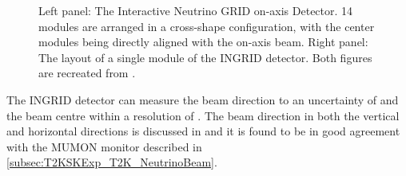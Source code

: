 \begin{figure}[h]
\begin{subfigure}[t]{0.55\textwidth}
  \end{subfigure}%
  \caption{Left panel: The Interactive Neutrino GRID on-axis Detector. 14 modules are arranged in a cross-shape configuration, with the center modules being directly aligned with the on-axis beam. Right panel: The layout of a single module of the INGRID detector. Both figures are recreated from \cite{t2k_det}.}
  \label{fig:T2KSKExp_T2K_INGRID}
\end{figure}

The INGRID detector can measure the beam direction to an uncertainty of  and the beam centre within a resolution of  \cite{t2k_det}. The beam direction in both the vertical and horizontal directions is discussed in \cite{Suzuki_2015} and it is found to be in good agreement with the MUMON monitor described in \autoref{subsec:T2KSKExp_T2K_NeutrinoBeam}.

